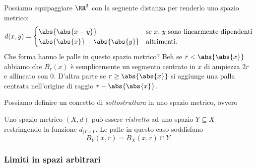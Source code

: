 \documentclass[11pt]{scrartcl}
\begin{document}
	\begin{example}
		Possiamo equipaggiare $\RR^2$ con la seguente distanza per renderlo uno spazio metrico:
		$$d(x,y)=
		\begin{cases}
			\abs{\abs{x-y}} & \text{se $x$, $y$ sono linearmente dipendenti} \\
			\abs{\abs{x}}+\abs{\abs{y}} & \text{altrimenti.}
		\end{cases}
		$$
		Che forma hanno le palle in questo spazio metrico? Beh se $r<\abs{\abs{x}}$ abbiamo che $B_r(x)$ è semplicemente un segmento centrato in $x$ di ampiezza $2r$ e allineato con $0$. D'altra parte se $r\ge \abs{\abs{x}}$ si aggiunge una palla centrata nell'origine di raggio $r-\abs{\abs{x}}$.
	\end{example}
	Possiamo definire un concetto di \textit{sottostruttura} in uno spazio metrico, ovvero
	\begin{definition}
		Uno spazio metrico $(X,d)$ può essere \textit{ristretto} ad uno spazio $Y\subseteq X$ restringendo la funzione $d_{\mid Y\times Y}$. Le palle in questo caso soddisfano
		$$B_Y(x,r)=B_X(x,r)\cap Y.$$
	\end{definition}
	
	\subsubsection{Limiti in spazi arbitrari}
	
\end{document}
